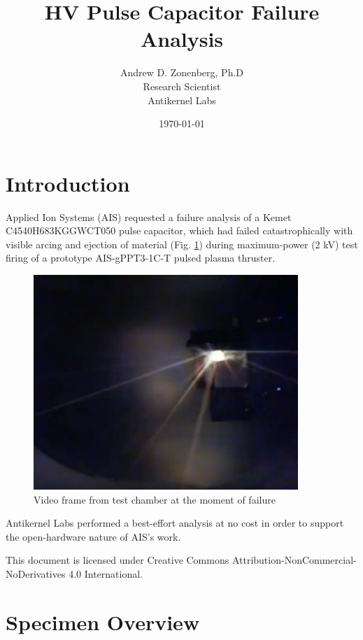 \documentclass{article}
\begin{document}
\title{HV Pulse Capacitor Failure Analysis }
\author {Andrew D. Zonenberg, Ph.D \\ Research Scientist \\ Antikernel Labs}
\date{\today}
\maketitle

\section{Introduction}

Applied Ion Systems (AIS) requested a failure analysis of a Kemet C4540H683KGGWCT050 pulse capacitor, which had failed
catastrophically with visible arcing and ejection of material (Fig. \ref{failure}) during maximum-power (2 kV) test
firing of a prototype AIS-gPPT3-1C-T pulsed plasma thruster.

\begin{figure}[h]
\includegraphics[width=10cm,keepaspectratio]{cap-failure.jpg}
\caption{Video frame from test chamber at the moment of failure}
\label{failure}
\end{figure}

Antikernel Labs performed a best-effort analysis at no cost in order to support the open-hardware nature of AIS's work.

This document is licensed under Creative Commons Attribution-NonCommercial-NoDerivatives 4.0 International.

\pagebreak
\section{Specimen Overview}
\end{document}
